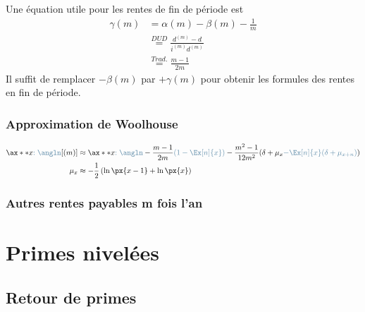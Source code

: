 \documentclass[10pt, french]{article}
\begin{document}
\begin{multicols*}{3}
Une équation utile pour les rentes de fin de période est 
\begin{align*}
	\gamma(m) 
	&=	\alpha(m) - \beta(m) - \frac{1}{m}	\\
	&\overset{DUD}{=} \frac{d^{(m)} - d}{i^{(m)} d^{(m)}}	\\
	&\overset{Trad.}{=} \frac{m - 1}{2m}	
\end{align*}
Il suffit de remplacer $-\beta(m)$ par $+\gamma(m)$ pour obtenir les formules des rentes en fin de période.


\subsubsection*{Approximation de Woolhouse}

\begin{align*}
	\ax**{x\color{airforceblue}{:\angln}}[(m)]	
	&\approx	\ax**{x\textcolor{airforceblue}{:\angln}}	-	
		\frac{m - 1}{2m} \textcolor{airforceblue}{\left( 1 - \Ex[n]{x} \right)}	-	
		\frac{m^{2} - 1}{12m^{2}}(\delta + \mu_{x} \textcolor{airforceblue}{- \Ex[n]{x} (\delta + \mu_{x + n})})		\\
	\mu_{x}
	&\approx		-	\frac{1}{2} \left( \ln \px{x - 1} + \ln \px{x} \right)
\end{align*}	


\subsubsection*{\textcolor{amber(sae/ece)}{Autres rentes payables m fois l'an}}


\newpage

\section{Primes nivelées}

\setcounter{subsection}{5}
\subsection{Retour de primes}


\end{multicols*}
\end{document}
